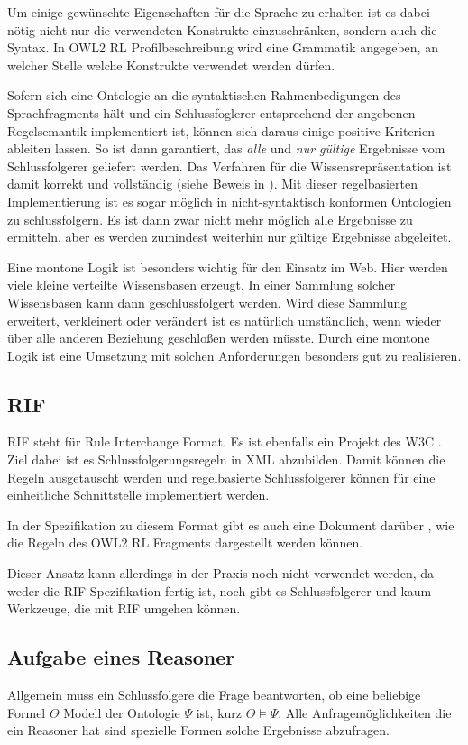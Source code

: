 Um einige gewünschte Eigenschaften für die Sprache zu erhalten ist es dabei nötig nicht nur die verwendeten Konstrukte einzuschränken, sondern auch die Syntax. In OWL2 RL Profilbeschreibung wird eine Grammatik angegeben, an welcher Stelle welche Konstrukte verwendet werden dürfen.

Sofern sich eine Ontologie an die syntaktischen Rahmenbedigungen des Sprachfragments hält und ein Schlussfoglerer entsprechend der angebenen Regelsemantik implementiert ist, können sich daraus einige positive Kriterien ableiten lassen. So ist dann garantiert, das \emph{alle} und \emph{nur gültige} Ergebnisse vom Schlussfolgerer geliefert werden. Das Verfahren für die Wissensrepräsentation ist damit korrekt und vollständig (siehe Beweis in \cite{OWL2Profiles}).
Mit dieser regelbasierten Implementierung ist es sogar möglich in nicht-syntaktisch konformen Ontologien zu schlussfolgern. Es ist dann zwar nicht mehr möglich alle Ergebnisse zu ermitteln, aber es werden zumindest weiterhin nur gültige Ergebnisse abgeleitet.

Eine montone Logik ist besonders wichtig für den Einsatz im Web. Hier werden viele kleine verteilte Wissensbasen erzeugt. In einer Sammlung solcher Wissensbasen kann dann geschlussfolgert werden. Wird diese Sammlung erweitert, verkleinert oder verändert ist es natürlich umständlich, wenn wieder über alle anderen Beziehung geschloßen werden müsste. Durch eine montone Logik ist eine Umsetzung mit solchen Anforderungen besonders gut zu realisieren.


\subsection{RIF}
\label{abschnitt-rif}
RIF steht für Rule Interchange Format. Es ist ebenfalls ein Projekt des W3C \cite{RIF2005}. Ziel dabei ist es Schlussfolgerungsregeln in XML abzubilden. Damit können die Regeln ausgetauscht werden und regelbasierte Schlussfolgerer können für eine einheitliche Schnittstelle implementiert werden.

In der Spezifikation zu diesem Format gibt es auch eine Dokument darüber \cite{Reynolds2009}, wie die Regeln des OWL2 RL Fragments dargestellt werden können.

Dieser Ansatz kann allerdings in der Praxis noch nicht verwendet werden, da weder die RIF Spezifikation fertig ist, noch gibt es Schlussfolgerer und kaum Werkzeuge, die mit RIF umgehen können.


\subsection{Aufgabe eines Reasoner}
Allgemein muss ein Schlussfolgere die Frage beantworten, ob eine beliebige Formel $\Theta$ Modell der Ontologie $\Psi$ ist, kurz $\Theta \models \Psi$. Alle Anfragemöglichkeiten die ein Reasoner hat sind spezielle Formen solche Ergebnisse abzufragen.

